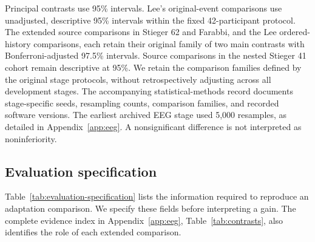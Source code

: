 \documentclass[11pt,a4paper]{article}
\begin{document}
Principal contrasts use 95\% intervals. Lee's original-event comparisons use unadjusted, descriptive 95\% intervals within the fixed 42-participant protocol. The extended source comparisons in Stieger 62 and Farabbi, and the Lee ordered-history comparisons, each retain their original family of two main contrasts with Bonferroni-adjusted 97.5\% intervals. Source comparisons in the nested Stieger 41 cohort remain descriptive at 95\%. We retain the comparison families defined by the original stage protocols, without retrospectively adjusting across all development stages. The accompanying statistical-methods record documents stage-specific seeds, resampling counts, comparison families, and recorded software versions. The earliest archived EEG stage used 5,000 resamples, as detailed in Appendix~\ref{app:eeg}. A nonsignificant difference is not interpreted as noninferiority.

\subsection{Evaluation specification}
\label{sec:evaluation-specification}

Table~\ref{tab:evaluation-specification} lists the information required to reproduce an adaptation comparison. We specify these fields before interpreting a gain. The complete evidence index in Appendix~\ref{app:eeg}, Table~\ref{tab:contrasts}, also identifies the role of each extended comparison.
\end{document}
